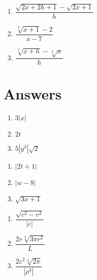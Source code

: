 \documentclass[11pt]{article}
\theoremstyle{definition}  %
\newcounter{HW}
\begin{document}
\enlargethispage{1in}

\begin{multicols}{3}
\begin{enumerate}
\setcounter{enumi}{\value{HW}}


\item  $\dfrac{\sqrt{2x+2h+1} - \sqrt{2x+1}}{h}$ 

\item  $\dfrac{\sqrt[3]{x+1} - 2}{x- 7}$                                          

\item  $\dfrac{\sqrt[3]{x+h} - \sqrt[3]{x}}{h}$  \label{rationalizelast}

\setcounter{HW}{\value{enumi}}
\end{enumerate}
\end{multicols}


\newpage

\section{Answers}

\begin{multicols}{3}
\begin{enumerate}

\item   $3|x|$ 

\item   $2t$

\item   $5|y^3|\sqrt{2}$

\setcounter{HW}{\value{enumi}}
\end{enumerate}
\end{multicols}

\begin{multicols}{3}
\begin{enumerate}
\setcounter{enumi}{\value{HW}}

\item  $|2t+1|$

\item  $|w-8|$

\item  $\sqrt{3x+1}$

\setcounter{HW}{\value{enumi}}
\end{enumerate}
\end{multicols}

\begin{multicols}{3}
\begin{enumerate}
\setcounter{enumi}{\value{HW}}

\item $\dfrac{\sqrt{c^2-v^2}}{|c|}$ 

\item $\dfrac{2r \sqrt[3]{3 \pi r^2}}{L}$ 

\item  $\dfrac{2 \varepsilon^2 \sqrt[4]{2\pi}}{|\rho^3|}$ 

\setcounter{HW}{\value{enumi}}
\end{enumerate}
\end{multicols}
\end{document}
